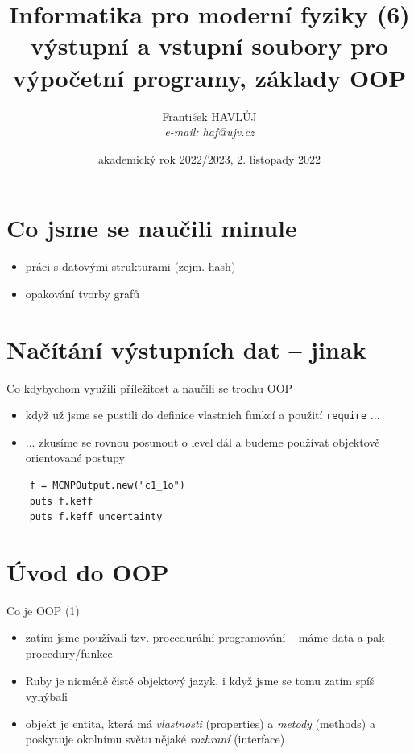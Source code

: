 \documentclass{beamer}
\title[IMF (6)]{Informatika pro moderní fyziky (6)\\výstupní a vstupní soubory pro výpočetní programy, základy OOP}
\author[Franti\v{s}ek HAVL\r{U}J, ORF ÚJV Řež]{Franti\v{s}ek HAVL\r{U}J\\{\scriptsize \emph{e-mail: haf@ujv.cz}}}
\date{akademický rok 2022/2023, 2. listopady 2022}
\institute[ORF ÚJV Řež]
{ÚJV Řež\\oddělení Reaktorové fyziky a podpory palivového cyklu}
\begin{document}
\begin{frame}
  \titlepage
\end{frame}

\begin{frame}
  \tableofcontents
\end{frame}

\section{Co jsme se naučili minule}

\begin{frame}{}
  \begin{itemize}
    \item práci s datovými strukturami (zejm. hash)
    \item opakování tvorby grafů
  \end{itemize}
\end{frame}

\section{Načítání výstupních dat – jinak}

\begin{frame}[fragile]{Co kdybychom využili příležitost a naučili se trochu OOP}
  \begin{itemize}
    \item když už jsme se pustili do definice vlastních funkcí a použití \texttt{require} ...
    \item ... zkusíme se rovnou posunout o level dál a budeme používat objektově orientované postupy
  \end{itemize}
  \begin{verbatim}
    f = MCNPOutput.new("c1_1o")
    puts f.keff
    puts f.keff_uncertainty
  \end{verbatim}
\end{frame}

\section{Úvod do OOP}

\begin{frame}{Co je OOP (1)}
  \begin{itemize}
    \item zatím jsme používali tzv. procedurální programování – máme data a pak procedury/funkce
    \item Ruby je nicméně čistě objektový jazyk, i když jsme se tomu zatím spíš vyhýbali
    \item objekt je entita, která má \emph{vlastnosti} (properties) a \emph{metody} (methods) a poskytuje okolnímu světu nějaké \emph{rozhraní} (interface)
  \end{itemize}
\end{frame}
\end{document}
